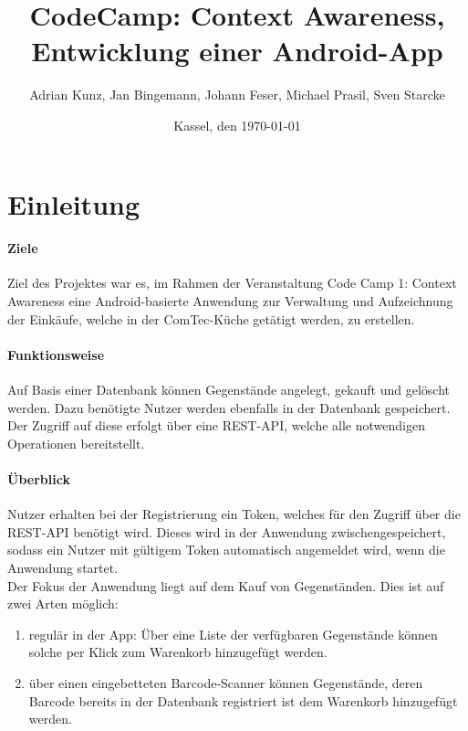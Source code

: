 \documentclass{scrartcl}
\begin{document}
	\title{CodeCamp: Context Awareness, Entwicklung einer Android-App}
	\author{Adrian Kunz, Jan Bingemann, Johann Feser, Michael Prasil, Sven Starcke}
	\date{Kassel, den \today}
	
	\maketitle
	\vspace*{10ex}
	\tableofcontents
	
	\newpage
	
	\section{Einleitung}
		\paragraph*{Ziele}
		Ziel des Projektes war es, im Rahmen der Veranstaltung \glqq Code Camp 1: Context Awareness\grqq{} eine Android-basierte Anwendung zur Verwaltung und Aufzeichnung der Einkäufe, welche in der ComTec-Küche getätigt werden, zu erstellen.
		
		\paragraph*{Funktionsweise}
		Auf Basis einer Datenbank können Gegenstände angelegt, gekauft und gelöscht werden. Dazu benötigte Nutzer werden ebenfalls in der Datenbank gespeichert. Der Zugriff auf diese erfolgt über eine REST-API, welche alle notwendigen Operationen bereitstellt.
		
		\paragraph*{Überblick}
		Nutzer erhalten bei der Registrierung ein Token, welches für den Zugriff über die REST-API benötigt wird. Dieses wird in der Anwendung zwischengespeichert, sodass ein Nutzer mit gültigem Token automatisch angemeldet wird, wenn die Anwendung startet. \\
		Der Fokus der Anwendung liegt auf dem Kauf von Gegenständen. Dies ist auf zwei Arten möglich: 
		
		\begin{enumerate}
			\item regulär in der App: Über eine Liste der verfügbaren Gegenstände können solche per Klick zum Warenkorb hinzugefügt werden.
			
			\item über einen eingebetteten Barcode-Scanner können Gegenstände, deren Barcode bereits in der Datenbank registriert ist dem Warenkorb hinzugefügt werden.
		\end{enumerate}
	
\end{document}
